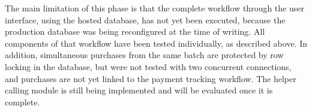 The main limitation of this phase is that the complete workflow through the user interface, using the hosted database, has not yet been executed, because the production database was being reconfigured at the time of writing. All components of that workflow have been tested individually, as described above. In addition, simultaneous purchases from the same batch are protected by row locking in the database, but were not tested with two concurrent connections, and purchases are not yet linked to the payment tracking workflow. The helper calling module is still being implemented and will be evaluated once it is complete.
